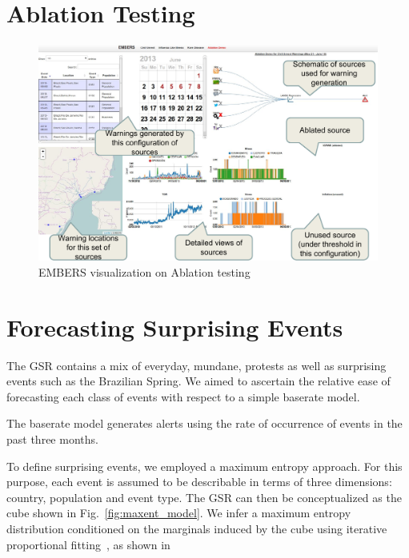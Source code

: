 \section{Ablation Testing}
\begin{figure}
\includegraphics[width=\columnwidth]{figures/cu/ablation.pdf}
\caption{EMBERS visualization on Ablation testing}
\label{fig:ablation}
\end{figure}
\section{Forecasting Surprising Events}


The GSR contains a mix of everyday, mundane, protests as well as surprising events such as the Brazilian Spring.
We aimed to ascertain the relative ease of forecasting each class of events
with respect to a simple baserate model.

The baserate model generates alerts using the rate of occurrence of events in the past three months.

To define surprising events,
we employed a maximum entropy approach. For this purpose, each event is assumed
to be describable
in terms of three dimensions: country, population and event type. The GSR can then be conceptualized
as the cube shown in Fig.~\ref{fig:maxent_model}. We infer a maximum entropy distribution conditioned on the marginals
induced by the cube using iterative proportional fitting~\cite{bishop2007discrete}, as shown in 

